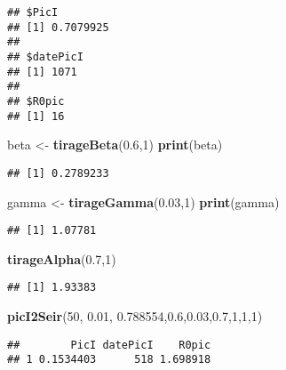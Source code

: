 \documentclass[
]{article}
\newenvironment{Shaded}{\begin{snugshade}}{\end{snugshade}}
\newcommand{\DecValTok}[1]{\textcolor[rgb]{0.00,0.00,0.81}{#1}}
\newcommand{\FloatTok}[1]{\textcolor[rgb]{0.00,0.00,0.81}{#1}}
\newcommand{\KeywordTok}[1]{\textcolor[rgb]{0.13,0.29,0.53}{\textbf{#1}}}
\newcommand{\NormalTok}[1]{#1}
\newcommand{\StringTok}[1]{\textcolor[rgb]{0.31,0.60,0.02}{#1}}
\begin{document}
\begin{verbatim}
## $PicI
## [1] 0.7079925
## 
## $datePicI
## [1] 1071
## 
## $R0pic
## [1] 16
\end{verbatim}

\begin{Shaded}
\begin{Highlighting}[]
\NormalTok{beta <-}\StringTok{ }\KeywordTok{tirageBeta}\NormalTok{(}\FloatTok{0.6}\NormalTok{,}\DecValTok{1}\NormalTok{)}
\KeywordTok{print}\NormalTok{(beta)}
\end{Highlighting}
\end{Shaded}

\begin{verbatim}
## [1] 0.2789233
\end{verbatim}

\begin{Shaded}
\begin{Highlighting}[]
\NormalTok{gamma <-}\StringTok{ }\KeywordTok{tirageGamma}\NormalTok{(}\FloatTok{0.03}\NormalTok{,}\DecValTok{1}\NormalTok{)}
\KeywordTok{print}\NormalTok{(gamma)}
\end{Highlighting}
\end{Shaded}

\begin{verbatim}
## [1] 1.07781
\end{verbatim}

\begin{Shaded}
\begin{Highlighting}[]
\KeywordTok{tirageAlpha}\NormalTok{(}\FloatTok{0.7}\NormalTok{,}\DecValTok{1}\NormalTok{)}
\end{Highlighting}
\end{Shaded}

\begin{verbatim}
## [1] 1.93383
\end{verbatim}

\begin{Shaded}
\begin{Highlighting}[]
\KeywordTok{picI2Seir}\NormalTok{(}\DecValTok{50}\NormalTok{, }\FloatTok{0.01}\NormalTok{, }\FloatTok{0.788554}\NormalTok{,}\FloatTok{0.6}\NormalTok{,}\FloatTok{0.03}\NormalTok{,}\FloatTok{0.7}\NormalTok{,}\DecValTok{1}\NormalTok{,}\DecValTok{1}\NormalTok{,}\DecValTok{1}\NormalTok{)}
\end{Highlighting}
\end{Shaded}

\begin{verbatim}
##        PicI datePicI    R0pic
## 1 0.1534403      518 1.698918
\end{verbatim}
\end{document}
